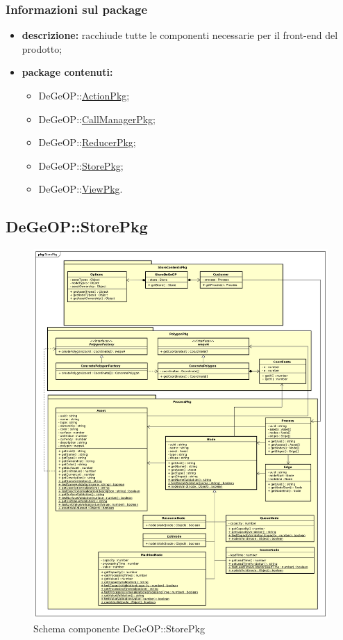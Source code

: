 \subsubsection{Informazioni sul package}
\begin{itemize}
	\item \textbf{descrizione:} racchiude tutte le componenti necessarie per il front-end del prodotto;
	\item \textbf{package contenuti:}
	\begin{itemize}
		\item DeGeOP::\hyperref[pkg::ActionPkg]{ActionPkg};
		\item DeGeOP::\hyperref[pkg::CallManagerPkg]{CallManagerPkg};
		\item DeGeOP::\hyperref[pkg::ReducerPkg]{ReducerPkg};
		\item DeGeOP::\hyperref[pkg::StorePkg]{StorePkg};
		\item DeGeOP::\hyperref[pkg::ViewPkg]{ViewPkg}.
	\end{itemize}
\end{itemize}
\newpage
\subsection{DeGeOP::StorePkg}
\label{pkg::StorePkg}
\begin{figure}[H]
	\centering
	\includegraphics[width=\textwidth]{img/PkgDiagram/StorePkg.png}
	\caption{Schema componente DeGeOP::StorePkg}
\end{figure}
